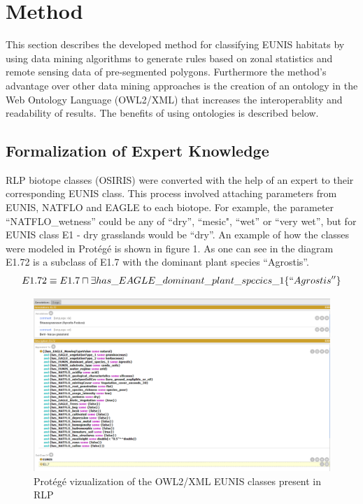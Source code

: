 \documentclass[authoryear, review,12pt,number]{elsarticle}
\begin{document}
\section{Method}
This section describes the developed method for classifying EUNIS habitats by
using data mining algorithms to generate rules based on zonal statistics and
remote sensing data of pre-segmented polygons. Furthermore the method's
advantage over other data mining approaches is the creation of an ontology in
the Web Ontology Language (OWL2/XML) that increases the interoperablity and
readability of results. The benefits of using ontologies is described below.
\subsection{Formalization of Expert Knowledge}
RLP biotope classes (OSIRIS) were converted with the help of an
expert to their corresponding EUNIS class. This process involved attaching
parameters from EUNIS, NATFLO and EAGLE to each biotope. For example, the parameter 
``NATFLO\_wetness'' could be any of ``dry'', ``mesic", ``wet'' or ``very wet'', 
but for EUNIS class E1 - dry grasslands would be ``dry''. An example of how the 
classes were modeled in Prot\'eg\'e is shown in figure 1. As one can see in the
diagram E1.72 is a subclass of E1.7 with the dominant plant species
``Agrostis''. 
$$ E1.72 \equiv  E1.7 \sqcap \exists has\_EAGLE\_dominant\_plant\_species\_1
\{``Agrostis'' \}
$$
\begin{figure}
	
\includegraphics[width=1\linewidth]{diagrams/protege_description_eunis.PNG}
	\caption{Prot\'eg\'e vizualization of the OWL2/XML EUNIS classes present in
	RLP}
\end{figure}
\end{document}
